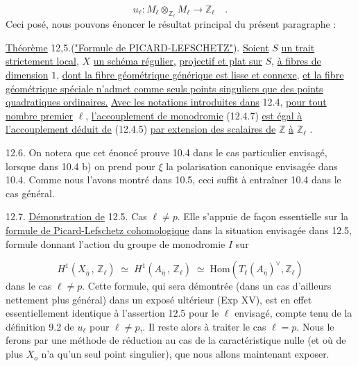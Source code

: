 \begin{equation}\tag{12.4.7}
u_{\ell} : M_{\ell} \otimes_{\mathbb{Z}_{\ell}} M_{\ell} \longrightarrow \mathbb{Z}_{\ell} \quad .
\end{equation}
Ceci posé, nous pouvons énoncer le résultat principal du présent paragraphe :

\underline{Théorème} 12,5.(\underline{"Formule de PICARD-LEFSCHETZ"}). \underline{Soient} $S$ \underline{un trait strictement local,} $X$ \underline{un schéma régulier,} \underline{projectif et plat sur} $S$, \underline{à fibres de dimension} $1$, \underline{dont la fibre géométrique générique est lisse et connexe}, \underline{et la fibre géométrique spéciale n'admet comme seuls points singuliers que des points quadratiques ordinaires.} \underline{Avec les notations introduites dans} 12.4, \underline{pour tout nombre premier} $\ell$, \underline{l'accouplement de monodromie} (12.4.7) \underline{est égal à l'accouplement déduit de} (12.4.5) \underline{par extension des scalaires de} $\mathbb{Z}$ \underline{à} $\mathbb{Z}_{\ell}$ .



12.6.  On notera que cet énoncé prouve 10.4 dans le cas particulier envisagé, lorsque dans 10.4 b) on prend pour $\xi$ la polarisation canonique envisagée dans 10.4. Comme nous l'avons montré dans 10.5, ceci suffit à entraîner 10.4 dans le cas général.

12.7.  \underline{Démonstration de} 12.5. Cas $\ell \neq p$. Elle s'appuie de façon essentielle sur la \underline{formule de Picard-Lefschetz cohomologique} dans la situation envisagée dans 12.5, formule donnant l'action du groupe de monodromie $I$ sur

\begin{equation}\tag{12.7.1}
H^1(X_{\overline{\eta}} \, , \, \mathbb{Z}_\ell) \;\simeq\; H^1(A_{\overline{\eta}} \, , \, \mathbb{Z}_\ell) \;\simeq\; \mathrm{Hom}(T_\ell(A_{\overline{\eta}})^{\vee}, \mathbb{Z}_\ell)
\end{equation}
dans le cas $\ell \neq p$. Cette formule, qui sera démontrée (dans un cas d'ailleurs nettement plus général) dans un exposé ultérieur (Exp XV), est en effet essentiellement identique à l'assertion 12.5 pour le $\ell$ envisagé, compte tenu de la définition 9.2 de $u_\ell$ pour $\ell \neq p$,. Il reste alors à traiter le cas $\ell = p$. Nous le ferons par une méthode de réduction au cas de la caractéristique nulle (et où de plus $X_o$ n'a qu'un seul point singulier), que nous allons maintenant exposer.

